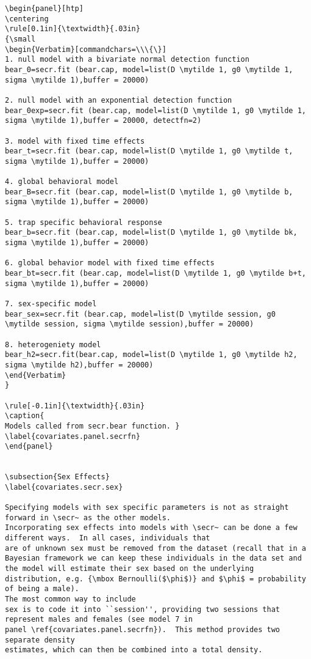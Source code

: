 {\begin{verbatim}
\begin{panel}[htp]
\centering
\rule[0.1in]{\textwidth}{.03in}
{\small
\begin{Verbatim}[commandchars=\\\{\}]
1. null model with a bivariate normal detection function
bear_0=secr.fit (bear.cap, model=list(D \mytilde 1, g0 \mytilde 1, sigma \mytilde 1),buffer = 20000)

2. null model with an exponential detection function
bear_0exp=secr.fit (bear.cap, model=list(D \mytilde 1, g0 \mytilde 1, sigma \mytilde 1),buffer = 20000, detectfn=2)

3. model with fixed time effects
bear_t=secr.fit (bear.cap, model=list(D \mytilde 1, g0 \mytilde t, sigma \mytilde 1),buffer = 20000)

4. global behavioral model
bear_B=secr.fit (bear.cap, model=list(D \mytilde 1, g0 \mytilde b, sigma \mytilde 1),buffer = 20000)

5. trap specific behavioral response
bear_b=secr.fit (bear.cap, model=list(D \mytilde 1, g0 \mytilde bk, sigma \mytilde 1),buffer = 20000)

6. global behavior model with fixed time effects
bear_bt=secr.fit (bear.cap, model=list(D \mytilde 1, g0 \mytilde b+t, sigma \mytilde 1),buffer = 20000)

7. sex-specific model
bear_sex=secr.fit (bear.cap, model=list(D \mytilde session, g0 \mytilde session, sigma \mytilde session),buffer = 20000)

8. heterogeniety model
bear_h2=secr.fit(bear.cap, model=list(D \mytilde 1, g0 \mytilde h2, sigma \mytilde h2),buffer = 20000)
\end{Verbatim}
}

\rule[-0.1in]{\textwidth}{.03in}
\caption{
Models called from secr.bear function. }
\label{covariates.panel.secrfn}
\end{panel}


\subsection{Sex Effects}
\label{covariates.secr.sex}

Specifying models with sex specific parameters is not as straight forward in \secr~ as the other models. 
Incorporating sex effects into models with \secr~ can be done a few
different ways.  In all cases, individuals that
are of unknown sex must be removed from the dataset (recall that in a Bayesian framework we can keep these individuals in the data set and the model will estimate their sex based on the underlying distribution, e.g. {\mbox Bernoulli($\phi$)} and $\phi$ = probability of being a male).
The most common way to include
sex is to code it into ``session'', providing two sessions that
represent males and females (see model 7 in 
panel \ref{covariates.panel.secrfn}).  This method provides two separate density
estimates, which can then be combined into a total density.  


\end{verbatim}}
